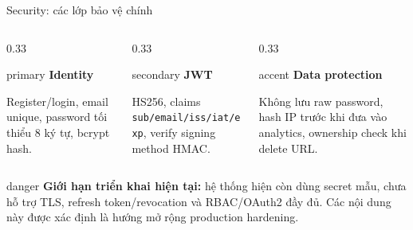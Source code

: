 \documentclass[aspectratio=169]{beamer}
\begin{document}
\begin{frame}{Security: các lớp bảo vệ chính}
    \begin{columns}[T,onlytextwidth]
        \begin{column}{0.33\textwidth}
            \begin{claimbox}{primary}
                \centering\textbf{Identity}\par\small
                Register/login, email unique, password tối thiểu 8 ký tự, bcrypt hash.
            \end{claimbox}
        \end{column}
        \begin{column}{0.33\textwidth}
            \begin{claimbox}{secondary}
                \centering\textbf{JWT}\par\small
                HS256, claims \texttt{sub/email/iss/iat/exp}, verify signing method HMAC.
            \end{claimbox}
        \end{column}
        \begin{column}{0.33\textwidth}
            \begin{claimbox}{accent}
                \centering\textbf{Data protection}\par\small
                Không lưu raw password, hash IP trước khi đưa vào analytics, ownership check khi delete URL.
            \end{claimbox}
        \end{column}
    \end{columns}
    \vspace{0.5cm}
    \begin{claimbox}{danger}
        \small \textbf{Giới hạn triển khai hiện tại:} hệ thống hiện còn dùng secret mẫu, chưa hỗ trợ TLS, refresh token/revocation và RBAC/OAuth2 đầy đủ. Các nội dung này được xác định là hướng mở rộng production hardening.
    \end{claimbox}
\end{frame}
\end{document}
